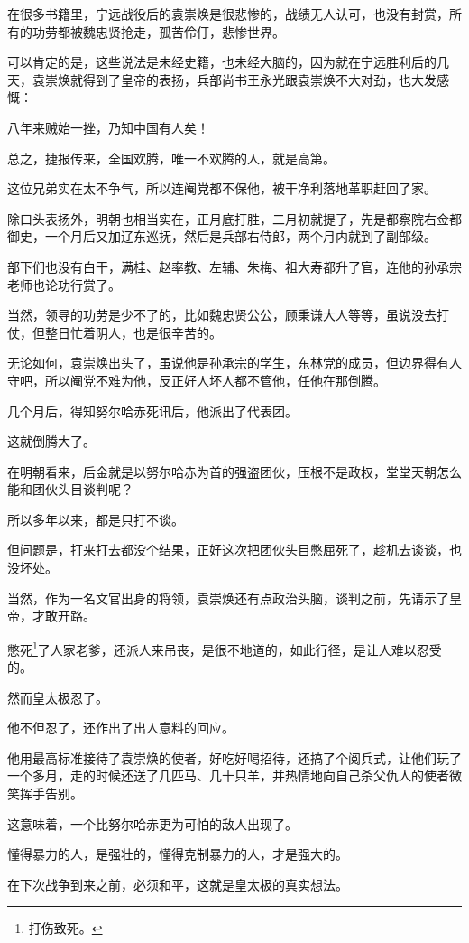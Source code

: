 \begin{multicols}{\theparacolNo}
在很多书籍里，宁远战役后的袁崇焕是很悲惨的，战绩无人认可，也没有封赏，所有的功劳都被魏忠贤抢走，孤苦伶仃，悲惨世界。

可以肯定的是，这些说法是未经史籍，也未经大脑的，因为就在宁远胜利后的几天，袁崇焕就得到了皇帝的表扬，兵部尚书王永光跟袁崇焕不大对劲，也大发感慨：

八年来贼始一挫，乃知中国有人矣！

总之，捷报传来，全国欢腾，唯一不欢腾的人，就是高第。

这位兄弟实在太不争气，所以连阉党都不保他，被干净利落地革职赶回了家。

除口头表扬外，明朝也相当实在，正月底打胜，二月初就提了，先是都察院右佥都御史，一个月后又加辽东巡抚，然后是兵部右侍郎，两个月内就到了副部级。

部下们也没有白干，满桂、赵率教、左辅、朱梅、祖大寿都升了官，连他的孙承宗老师也论功行赏了。

当然，领导的功劳是少不了的，比如魏忠贤公公，顾秉谦大人等等，虽说没去打仗，但整日忙着阴人，也是很辛苦的。

无论如何，袁崇焕出头了，虽说他是孙承宗的学生，东林党的成员，但边界得有人守吧，所以阉党不难为他，反正好人坏人都不管他，任他在那倒腾。

几个月后，得知努尔哈赤死讯后，他派出了代表团。

这就倒腾大了。

在明朝看来，后金就是以努尔哈赤为首的强盗团伙，压根不是政权，堂堂天朝怎么能和团伙头目谈判呢？

所以多年以来，都是只打不谈。

但问题是，打来打去都没个结果，正好这次把团伙头目憋屈死了，趁机去谈谈，也没坏处。

当然，作为一名文官出身的将领，袁崇焕还有点政治头脑，谈判之前，先请示了皇帝，才敢开路。

憋死\footnote{打伤致死。}了人家老爹，还派人来吊丧，是很不地道的，如此行径，是让人难以忍受的。

然而皇太极忍了。

他不但忍了，还作出了出人意料的回应。

他用最高标准接待了袁崇焕的使者，好吃好喝招待，还搞了个阅兵式，让他们玩了一个多月，走的时候还送了几匹马、几十只羊，并热情地向自己杀父仇人的使者微笑挥手告别。

这意味着，一个比努尔哈赤更为可怕的敌人出现了。

懂得暴力的人，是强壮的，懂得克制暴力的人，才是强大的。

在下次战争到来之前，必须和平，这就是皇太极的真实想法。


\end{multicols}
